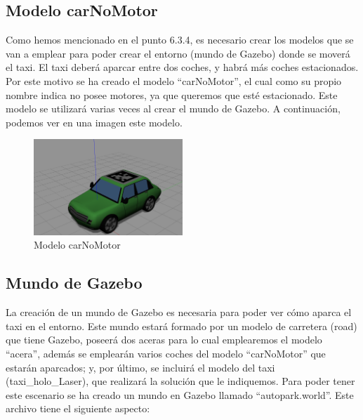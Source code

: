 \subsection{Modelo carNoMotor}
Como hemos mencionado en el punto 6.3.4, es necesario crear los modelos que se van a emplear para poder crear el entorno (mundo de Gazebo) donde se moverá el taxi. El taxi deberá aparcar entre dos coches, y habrá más coches estacionados. Por este motivo se ha creado el modelo ``carNoMotor'', el cual como su propio nombre indica no posee motores, ya que queremos que esté estacionado. Este modelo se utilizará varias veces al crear el mundo de Gazebo. A continuación, podemos ver en una imagen este modelo.\\

\begin{figure}[H]
  \begin{center}
    \includegraphics[width=0.5\textwidth]{figures/Autopark/carNoMotor.png}
		\caption{Modelo carNoMotor}
		\label{fig.carNoMotor}
		\end{center}
\end{figure}

\subsection{Mundo de Gazebo}
La creación de un mundo de Gazebo es necesaria para poder ver cómo aparca el taxi en el entorno. Este mundo estará formado por un modelo de carretera (road) que tiene Gazebo, poseerá dos aceras para lo cual emplearemos el modelo ``acera'', además se emplearán varios coches del modelo ``carNoMotor'' que estarán aparcados; y, por último, se incluirá el modelo del taxi (taxi\_holo\_Laser), que realizará la solución que le indiquemos. Para poder tener este escenario se ha creado un mundo en Gazebo llamado ``autopark.world''. Este archivo tiene el siguiente aspecto:\\

